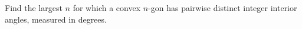 Find the largest $n$ for which a convex $n$-gon has pairwise distinct integer interior angles, measured in degrees.
